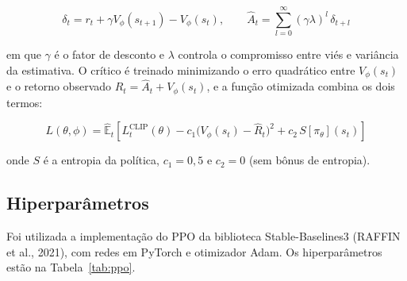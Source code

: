 \begin{equation}
    \delta_t = r_t + \gamma V_\phi(s_{t+1}) - V_\phi(s_t), \qquad
    \hat{A}_t = \sum_{l=0}^{\infty} (\gamma\lambda)^l \, \delta_{t+l}
    \label{eq:gae}
\end{equation}

\noindent em que $\gamma$ é o fator de desconto e $\lambda$ controla o compromisso entre viés e variância da estimativa. O crítico é treinado minimizando o erro quadrático entre $V_\phi(s_t)$ e o retorno observado $\hat{R}_t = \hat{A}_t + V_\phi(s_t)$, e a função otimizada combina os dois termos:

\begin{equation}
    L(\theta, \phi) = \hat{\mathbb{E}}_t \left[ L^{\text{CLIP}}_t(\theta) - c_1 \big( V_\phi(s_t) - \hat{R}_t \big)^2 + c_2 \, S[\pi_\theta](s_t) \right]
    \label{eq:ppo_total}
\end{equation}

\noindent onde $S$ é a entropia da política, $c_1 = 0{,}5$ e $c_2 = 0$ (sem bônus de entropia).

\subsection{Hiperparâmetros}

Foi utilizada a implementação do PPO da biblioteca Stable-Baselines3 (RAFFIN et al., 2021), com redes em PyTorch e otimizador Adam. Os hiperparâmetros estão na Tabela~\ref{tab:ppo}.

